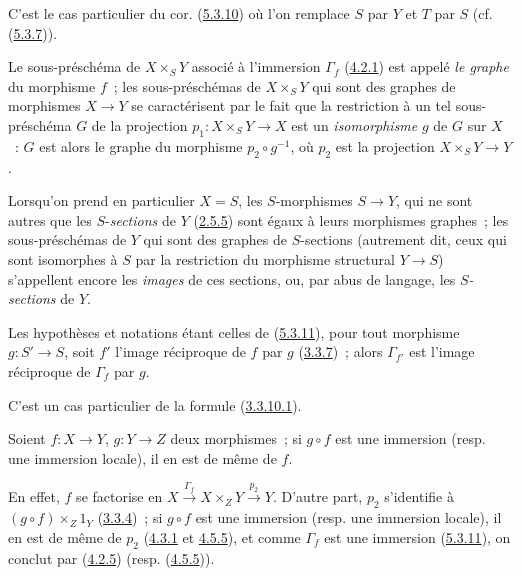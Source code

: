 C'est le cas particulier du cor. (\hyperref[I.5.3.10-fr]{5.3.10}) où l'on
remplace $S$ par $Y$ et $T$ par $S$
(cf. (\hyperref[I.5.3.7-fr]{5.3.7})).

Le sous-préschéma de $X\times_S Y$ associé à l'immersion $\Gamma_f$
(\hyperref[I.4.2.1-fr]{4.2.1}) est appelé \emph{le graphe} du morphisme $f$~;
les sous-préschémas de $X\times_S Y$ qui sont des graphes de morphismes
$X\to Y$ se caractérisent par le fait que la restriction à un tel
sous-préschéma $G$ de la projection $p_1:X\times_S Y\to X$ est un
\emph{isomorphisme} $g$ de $G$ sur $X$~: $G$ est alors le graphe du morphisme
$p_2\circ g^{-1}$, où $p_2$ est la projection $X\times_S Y\to Y$.

Lorsqu'on prend en particulier $X=S$, les $S$-morphismes $S\to Y$, qui ne
sont autres que les $S$-\emph{sections} de $Y$ (\hyperref[I.2.5.5-fr]{2.5.5}) sont
égaux à leurs morphismes graphes~; les sous-préschémas de $Y$ qui sont des
graphes de $S$-sections (autrement dit, ceux qui sont isomorphes à $S$ par la
restriction du morphisme structural $Y\to S$) s'appellent encore les
\emph{images} de ces sections, ou, par abus de langage, les
\emph{$S$-sections} de $Y$.

\begin{corollary}[5.3.12]
\label{I.5.3.12-fr}
Les hypothèses et notations étant celles de
(\hyperref[I.5.3.11-fr]{5.3.11}), pour tout morphisme $g:S'\to S$, soit $f'$
l'image réciproque de $f$ par $g$ (\hyperref[I.3.3.7-fr]{3.3.7})~; alors
$\Gamma_{f'}$ est l'image réciproque de $\Gamma_f$ par $g$.
\end{corollary}

C'est un cas particulier de la formule
(\hyperref[I.3.3.10.1-fr]{3.3.10.1}).

\begin{corollary}[5.3.13]
\label{I.5.3.13-fr}
Soient $f:X\to Y$, $g:Y\to Z$ deux morphismes~; si $g\circ f$ est une
immersion (\textup{resp.} une immersion locale), il en est de même de $f$.
\end{corollary}

En effet, $f$ se factorise en $X\xrightarrow{\Gamma_f}X\times_Z Y\xrightarrow{p_2}Y$. D'autre part, $p_2$ s'identifie à $(g\circ f)\times_Z 1_Y$
(\hyperref[I.3.3.4-fr]{3.3.4})~; si $g\circ f$ est une immersion (resp. une
immersion locale), il en est de même de $p_2$
(\hyperref[I.4.3.1-fr]{4.3.1} et \hyperref[I.4.5.5-fr]{4.5.5}), et comme
$\Gamma_f$ est une immersion (\hyperref[I.5.3.11-fr]{5.3.11}), on conclut
par (\hyperref[I.4.2.5-fr]{4.2.5}) (resp.
(\hyperref[I.4.5.5-fr]{4.5.5})).

